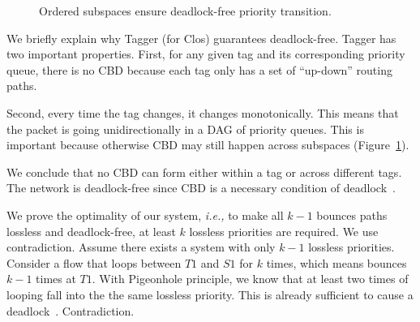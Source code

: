 \begin{figure}[t]
	\centering
	
	
	\caption{Ordered subspaces ensure deadlock-free priority transition.}\label{fig:subspace}
\end{figure}

 We briefly explain why Tagger (for Clos) guarantees deadlock-free.
Tagger has two important properties. First, for any given tag and its corresponding priority queue,
there is no CBD because each tag only has a set of ``up-down'' routing paths.

Second, every time the tag changes, it changes monotonically. This means that the packet is 
going unidirectionally in a DAG of priority queues. This is important because otherwise CBD 
may still happen across subspaces (Figure~\ref{fig:subspace}).

We conclude that no CBD can form either within a tag or across different tags. The
network is deadlock-free since CBD is a necessary condition of deadlock~\cite{our_hotnets_paper}.

 We prove the optimality of our system, {\em i.e.,} to make all $k-1$ bounces 
paths lossless and deadlock-free, at least $k$ lossless priorities are required. We use contradiction.
Assume there exists a system with only $k-1$ lossless priorities. Consider a flow that loops between 
$T1$ and $S1$ for $k$ times, which means bounces $k-1$ times at $T1$. With Pigeonhole principle, 
we know that at least two times of looping fall into the the same lossless priority. This is 
already sufficient to cause a deadlock~\cite{our_hotnets_paper}. Contradiction.


